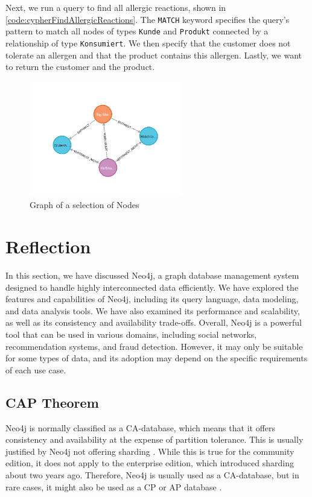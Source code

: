 Next, we run a query to find all allergic reactions, shown in \autoref{code:cypherFindAllergicReactions}. The \texttt{MATCH} keyword specifies the query's pattern to match all nodes of types \texttt{Kunde} and \texttt{Produkt} connected by a relationship of type \texttt{Konsumiert}. We then specify that the customer does not tolerate an allergen and that the product contains this allergen. Lastly, we want to return the customer and the product.

\begin{figure}[H]
    \centering
    \caption{Graph of a selection of Nodes} \label{fig:neo4jGraph_2}
    \includegraphics[width=0.6\textwidth]{images/neo4j_example_graph_2.png}
\end{figure}

\section{Reflection} \label{sec:reflectionNeo4j}

In this section, we have discussed Neo4j, a graph database management system designed to handle highly interconnected data efficiently. We have explored the features and capabilities of Neo4j, including its query language, data modeling, and data analysis tools. We have also examined its performance and scalability, as well as its consistency and availability trade-offs. Overall, Neo4j is a powerful tool that can be used in various domains, including social networks, recommendation systems, and fraud detection. However, it may only be suitable for some types of data, and its adoption may depend on the specific requirements of each use case.

\subsection{CAP Theorem} \label{subsec:capTheoremNeo4j}

Neo4j is normally classified as a \ac{CA}-database, which means that it offers consistency and availability at the expense of partition tolerance. This is usually justified by Neo4j not offering sharding \parencite{cap_neo4j}. While this is true for the community edition, it does not apply to the enterprise edition, which introduced sharding about two years ago. Therefore, Neo4j is usually used as a \ac{CA}-database, but in rare cases, it might also be used as a \ac{CP} or \ac{AP} database \parencite{consistency_models_cap_neo4j}.

